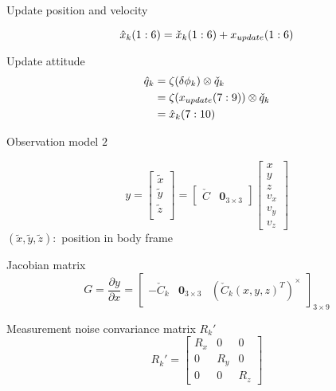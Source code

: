 \documentclass{cisXXX} %
\begin{document}
Update position and velocity

\begin{equation}
\hat{x}_k\small{(1:6)} = \check{x}_k\small{(1:6)}+x_{update}\small{(1:6)}
\end{equation}

Update attitude
\begin{equation}
\begin{split}
\hat{q}_k &= \zeta(\delta \phi_k)\otimes \check{q}_k    \\
		  &= \zeta(x_{update}\tiny{(7:9)})\otimes \check{q}_k  \\
		  &= \hat{x}_k\small{(7:10)}
\end{split}
\end{equation}

\newpage
Observation model $2$

\begin{equation}
\renewcommand\arraystretch{1.2}
y=\begin{bmatrix}
\tilde{x}   \\
\tilde{y}   \\
\tilde{z}   \\
\end{bmatrix}=\begin{bmatrix}
\check{C} & \bm{0}_{3\times 3}  
\end{bmatrix}\begin{bmatrix}
	x   \\
	y   \\
	z   \\
	v_x   \\
	v_y   \\
	v_z   
\end{bmatrix}
\end{equation}
$(\tilde{x},\tilde{y},\tilde{z}):$ position in body frame

Jacobian matrix
\begin{equation}
G=\frac{\partial y}{\partial x}=\begin{bmatrix}
-\check{C}_k  & \bm{0}_{3\times 3} & (\check{C}_k(x, y ,z)^T)^{\times} 
\end{bmatrix}_{3\times 9}
\end{equation}

Measurement noise convariance matrix $R_k'$
\begin{equation}
R_k'=\begin{bmatrix}
R_{x}  & 0   & 0 \\
0  & R_{y}   & 0 \\
0  & 0   & R_{z} 
\end{bmatrix}
\end{equation}
\end{document}

